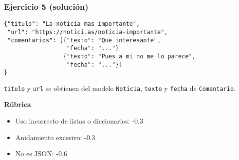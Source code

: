\subsubsection{Ejercicio 5 (solución)}

\begin{verbatim}
{"titulo": "La noticia mas importante",
 "url": "https://notici.as/noticia-importante",
 "comentarios": [{"texto": "Que interesante",
                  "fecha": "..."}
                 {"texto": "Pues a mi no me lo parece",
                  "fecha": "..."}]
}
\end{verbatim}

\texttt{titulo} y \texttt{url} se obtienen del modelo \texttt{Noticia},
\texttt{texto} y \texttt{fecha} de \texttt{Comentario}.

\vspace{.4cm}\textbf{Rúbrica}

\begin{itemize}
\item Uso incorrecto de listas o diccionarios: -0.3
\item Anidamiento excesivo: -0.3
\item No es JSON: -0.6
\end{itemize}
